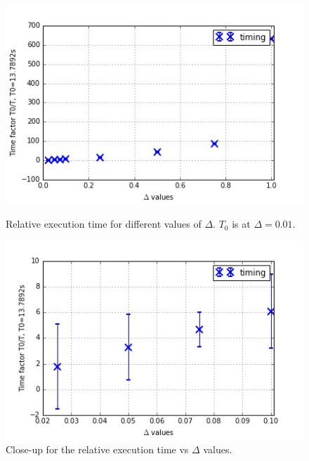 \documentclass[11pt]{article}
\begin{document}
	\begin{figure}[H]	
		\centering
		\begin{minipage}[b]{.5\textwidth}
			\centering
			\includegraphics[width=\linewidth]{itervs3.jpeg}
			\caption{Relative execution time for different values of $\Delta$. $T_0$ is at $\Delta=0.01$.}\label{iter3}
		\end{minipage}%
		\begin{minipage}[b]{.5\textwidth}
			\centering
			\includegraphics[width=\linewidth]{itervs32.jpeg}
			\caption{Close-up for the relative execution time vs $\Delta$ values.}\label{iter32}
		\end{minipage}
	\end{figure}
	
\end{document}
